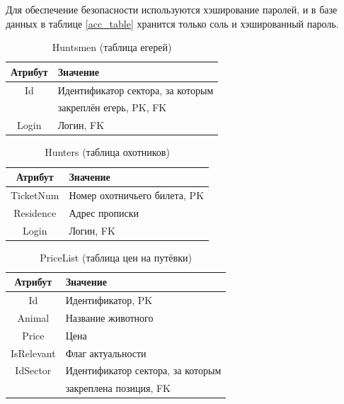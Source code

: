 	Для обеспечение безопасности используются хэширование паролей, и в базе данных в таблице \ref{acc_table} хранится только соль и хэшированный пароль.\\

	\begin{table}[pt!] 
		\begin{center}
			\caption{Huntsmen (таблица егерей)}
			\label{huntsmen_table}
			\begin{tabular}{| c | l |}
				\hline
				\textbf{Атрибут} 	& \textbf{Значение} \\
				\hline
				Id 					&	Идентификатор сектора, за которым \\
									& 	закреплён егерь, PK, FK \\
				\hline
				Login	 			&	Логин, FK \\ 
				\hline
			\end{tabular}
		\end{center}
	\end{table}

	\begin{table}[pt!] 
		\begin{center}
			\caption{Hunters (таблица охотников)}
			\label{hunters_table}
			\begin{tabular}{| c | l |}
				\hline
				\textbf{Атрибут} 	& \textbf{Значение} \\
				\hline
				TicketNum 			&	Номер охотничьего билета, PK\\
				\hline
				Residence			& 	Адрес прописки \\
				\hline
				Login	 			&	Логин, FK \\ 
				\hline
			\end{tabular}
		\end{center}
	\end{table}

	\begin{table}[pt!]
		\begin{center}
			\caption{PriceList (таблица цен на путёвки)}
			\label{price_table}
			\begin{tabular}{| c | l |}
				\hline
				\textbf{Атрибут} 	& \textbf{Значение} \\
				\hline
				Id 					&	Идентификатор, PK\\
				\hline
				Animal				& 	Название животного \\
				\hline
				Price	 			&	Цена \\ 
				\hline
				IsRelevant	 		&	Флаг актуальности \\ 
				\hline
				IdSector	 		&	Идентификатор сектора, за которым \\
									& 	закреплена позиция, FK \\
				\hline
			\end{tabular}
		\end{center}
	\end{table}


